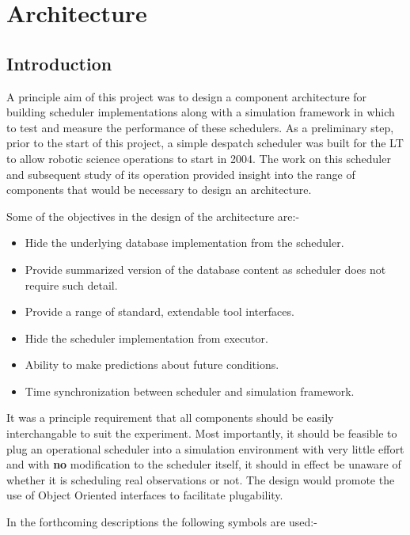 \section{Architecture}
\label{sect:architecture}

\subsection{Introduction}
A principle aim of this project was to design a component architecture for building scheduler implementations along with a simulation framework in which to test and measure the performance of these schedulers. As a preliminary step, prior to the start of this project, a simple despatch scheduler \cite{fraser04scheduling} was built for the LT to allow robotic science operations to start in 2004. The work on this scheduler and subsequent study of its operation provided insight into the range of components that would be necessary to design an architecture.

Some of the objectives in the design of the architecture are:-
\begin{itemize}
\item Hide the underlying database implementation from the scheduler.
\item Provide summarized version of the database content as scheduler does not require such detail.
\item Provide a range of standard, extendable tool interfaces.
\item Hide the scheduler implementation from executor.
\item Ability to make predictions about future conditions.
\item Time synchronization between scheduler and simulation framework.
\end{itemize}

It was a principle requirement that all components should be easily interchangable to suit the experiment. Most importantly, it should be feasible to plug an operational scheduler into a simulation environment with very little effort and with {\bf no} modification to the scheduler itself, it should in effect be unaware of whether it is scheduling real observations or not. The design would promote the use of Object Oriented interfaces to facilitate plugability.

In the forthcoming descriptions the following symbols are used:-

